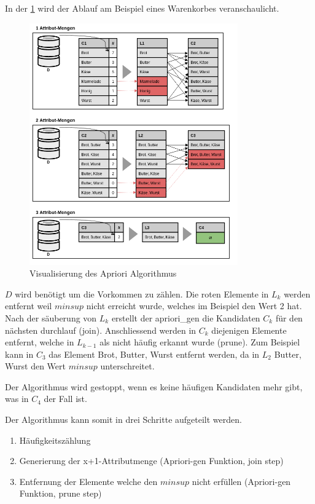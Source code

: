 In der \cref{fig:konzept:vorgehensweise:apriorialgorithmus} wird der Ablauf am Beispiel eines Warenkorbes veranschaulicht.

\begin{figure}[H]
	\RawFloats
	\centering
	\includegraphics[width=0.8\textwidth]{images/Apriori-Algorithmus.png}
	\caption{Visualisierung des Apriori Algorithmus}
	\label{fig:konzept:vorgehensweise:apriorialgorithmus}
\end{figure}

$D$ wird benötigt um die Vorkommen zu zählen. Die roten Elemente in $L_k$ werden entfernt weil $minsup$ nicht erreicht wurde, welches im Beispiel den Wert 2 hat. Nach der säuberung von $L_k$ erstellt der apriori\_gen die Kandidaten $C_k$ für den nächsten durchlauf (join). Anschliessend werden in $C_k$ diejenigen Elemente entfernt, welche in $L_{k-1}$ als nicht häufig erkannt wurde (prune). Zum Beispiel kann in $C_3$ das Element {Brot, Butter, Wurst} entfernt werden, da in $L_2$ {Butter, Wurst} den Wert $minsup$ unterschreitet.

Der Algorithmus wird gestoppt, wenn es keine häufigen Kandidaten mehr gibt, was in $C_4$ der Fall ist.

Der Algorithmus kann somit in drei Schritte aufgeteilt werden.
\begin{enumerate}
\item Häufigkeitszählung
\item Generierung der x+1-Attributmenge (Apriori-gen Funktion, join step)
\item Entfernung der Elemente welche den $minsup$ nicht erfüllen (Apriori-gen Funktion, prune step)
\end{enumerate}

